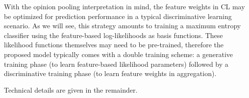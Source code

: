 \documentclass[english]{scrartcl}
\begin{document}

With the opinion pooling interpretation in mind, the feature weights in CL may be optimized for prediction performance in a typical discriminative learning scenario. As we will see, this strategy amounts to training a maximum entropy classifier using the feature-based log-likelihoods as basis functions. These likelihood functions themselves may need to be pre-trained, therefore the proposed model typically comes with a double training scheme: a generative training phase (to learn feature-based likelihood parameters) followed by a discriminative training phase (to learn feature weights in aggregation).

Technical details are given in the remainder.






\end{document}
